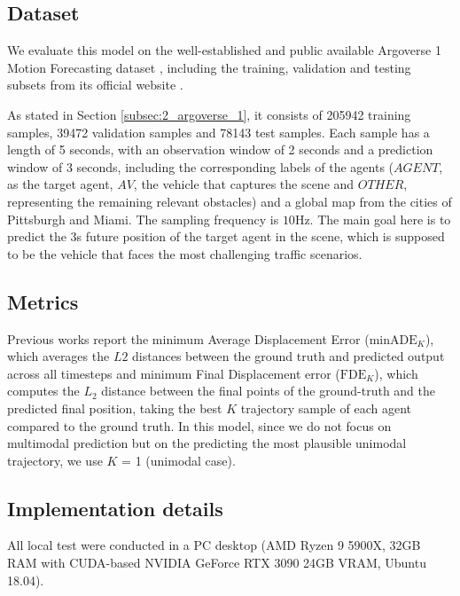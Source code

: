 \subsection{Dataset}
\label{subsec:5_dataset}

We evaluate this model on the well-established and public available Argoverse 1 Motion Forecasting dataset \cite{chang2019argoverse}, including the training, validation and testing subsets from its official website \cite{argobench}. 

As stated in Section \ref{subsec:2_argoverse_1}, it consists of 205942 training samples, 39472 validation samples and 78143 test samples. Each sample has a length of 5 seconds, with an observation window of 2 seconds and a prediction window of 3 seconds, including the corresponding labels of the agents ($AGENT$, as the target agent, $AV$, the vehicle that captures the scene and $OTHER$, representing the remaining relevant obstacles) and a global map from the cities of Pittsburgh and Miami. The sampling frequency is $10\mathrm{Hz}$. The main goal here is to predict the 3s future position of the target agent in the scene, which is supposed to be the vehicle that faces the most challenging traffic scenarios.

\subsection{Metrics}
\label{subsec:5_metrics}

Previous works \cite{chai2019multipath, mercat2020multi, sadeghian2019sophie} report the minimum Average Displacement Error ($\text{minADE}_K$), which averages the $L2$ distances between the ground truth and predicted output across all timesteps and minimum Final Displacement error ($\text{FDE}_K$), which computes the $L_{2}$ distance between the final points of the ground-truth and the predicted final position, taking the best $K$ trajectory sample of each agent compared to the ground truth. In this model, since we do not focus on multimodal prediction but on the predicting the most plausible unimodal trajectory, we use $K$ = 1 (unimodal case).

\subsection{Implementation details}
\label{subsec:5_implementation_details}

All local test were conducted in a PC desktop (AMD Ryzen 9 5900X, 32GB RAM with CUDA-based NVIDIA GeForce RTX 3090 24GB VRAM, Ubuntu 18.04).

